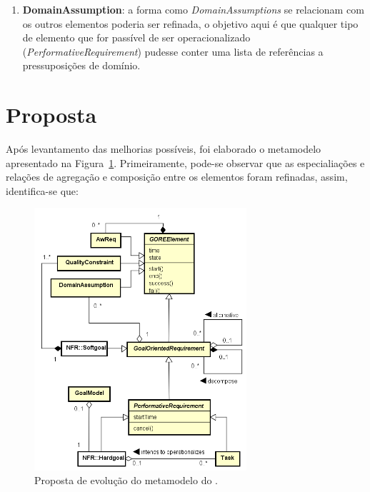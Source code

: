 \begin{enumerate}
	\item \textbf{DomainAssumption}: a forma como \textit{DomainAssumptions} se relacionam com os outros elementos poderia ser refinada, o objetivo aqui é que qualquer tipo de elemento que for passível de ser operacionalizado (\textit{PerformativeRequirement}) pudesse conter uma lista de referências a pressuposições de domínio. \label{p6}
\end{enumerate}

\section{Proposta}
\label{sec-zanshin-proposta}

Após levantamento das melhorias possíveis, foi elaborado o metamodelo apresentado na Figura~\ref{figura-metamodelo-novo}. Primeiramente, pode-se observar que as especialiações e relações de agregação e composição entre os elementos foram refinadas, assim, identifica-se que:

\begin{figure}
	\centering
	\includegraphics[width=0.7\textwidth]{figuras/metamodelos/metamodelo-zanshin-novo.png}
	\caption{Proposta de evolução do metamodelo do \framework \zanshin. }
	\label{figura-metamodelo-novo}
\end{figure}

